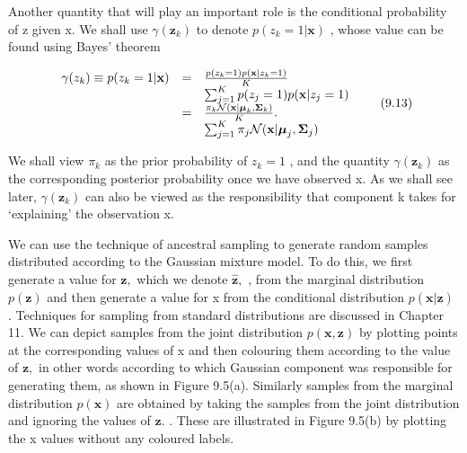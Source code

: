 \documentclass[
  10
]{article}
\begin{document}
Another quantity that will play an important role is the conditional
probability of z given x. We shall use
\(\gamma ( \boldsymbol { z } _ { k } )\) to denote
\(p ( z _ { k } = 1 | \mathbf { x } )\) , whose value can be found using
Bayes' theorem

\[
\begin{array}{l l l} \gamma (z _ {k}) \equiv p (z _ {k} = 1 | \mathbf {x}) & = & \frac {p (z _ {k} = 1) p (\mathbf {x} | z _ {k} = 1)}{K} \\ & & \sum_ {j = 1} ^ {K} p (z _ {j} = 1) p (\mathbf {x} | z _ {j} = 1) \\ & = & \frac {\pi_ {k} \mathcal {N} (\mathbf {x} | \boldsymbol {\mu} _ {k} , \boldsymbol {\Sigma} _ {k})}{K}. \\ & & \sum_ {j = 1} ^ {K} \pi_ {j} \mathcal {N} (\mathbf {x} | \boldsymbol {\mu} _ {j}, \boldsymbol {\Sigma} _ {j}) \end{array}\tag{9.13}
\]

We shall view \(\pi _ { k }\) as the prior probability of
\(z _ { k } = 1\) , and the quantity
\(\gamma ( \boldsymbol { z } _ { k } )\) as the corresponding posterior
probability once we have observed x. As we shall see later,
\(\gamma ( \boldsymbol { z } _ { k } )\) can also be viewed as the
responsibility that component k takes for `explaining' the observation
x.

We can use the technique of ancestral sampling to generate random
samples distributed according to the Gaussian mixture model. To do this,
we first generate a value for \(\mathbf { z } ,\) which we denote
\({ \widehat { \mathbf { z } } } ,\) , from the marginal distribution
\(p ( \mathbf { z } )\) and then generate a value for x from the
conditional distribution
\(p ( \mathbf { x } | \widehat { \mathbf { z } } )\) . Techniques for
sampling from standard distributions are discussed in Chapter 11. We can
depict samples from the joint distribution
\(p ( \mathbf { x } , \mathbf { z } )\) by plotting points at the
corresponding values of x and then colouring them according to the value
of \(\mathbf { z } ,\) in other words according to which Gaussian
component was responsible for generating them, as shown in Figure
9.5(a). Similarly samples from the marginal distribution
\(p ( \mathbf { x } )\) are obtained by taking the samples from the
joint distribution and ignoring the values of \(\mathbf { z } .\) .
These are illustrated in Figure 9.5(b) by plotting the x values without
any coloured labels.
\end{document}
